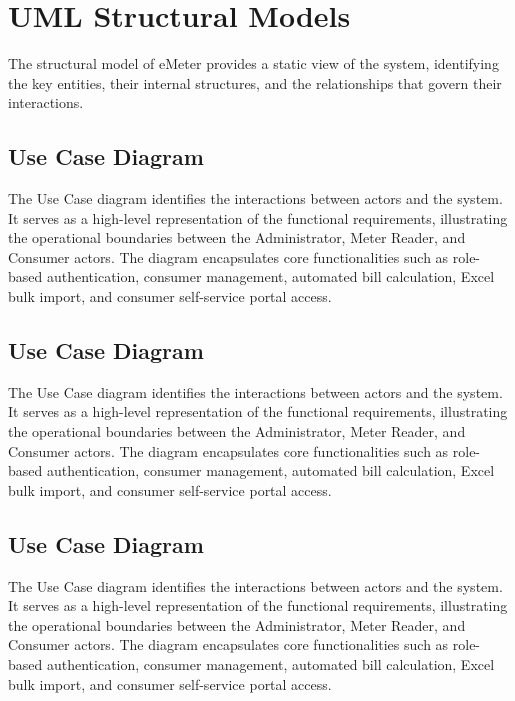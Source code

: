\documentclass[12pt, a4paper, onecolumn]{report}
\begin{document}
\newpage

\section{UML Structural Models}
The structural model of eMeter provides a static view of the system, identifying the key entities, their internal structures, and the relationships that govern their interactions.

\subsection{Use Case Diagram}
The Use Case diagram identifies the interactions between actors and the system. It serves as a high-level representation of the functional requirements, illustrating the operational boundaries between the Administrator, Meter Reader, and Consumer actors. The diagram encapsulates core functionalities such as role-based authentication, consumer management, automated bill calculation, Excel bulk import, and consumer self-service portal access.


\subsection{Use Case Diagram}
The Use Case diagram identifies the interactions between actors and the system. It serves as a high-level representation of the functional requirements, illustrating the operational boundaries between the Administrator, Meter Reader, and Consumer actors. The diagram encapsulates core functionalities such as role-based authentication, consumer management, automated bill calculation, Excel bulk import, and consumer self-service portal access.

\subsection{Use Case Diagram}
The Use Case diagram identifies the interactions between actors and the system. It serves as a high-level representation of the functional requirements, illustrating the operational boundaries between the Administrator, Meter Reader, and Consumer actors. The diagram encapsulates core functionalities such as role-based authentication, consumer management, automated bill calculation, Excel bulk import, and consumer self-service portal access.
\end{document}
